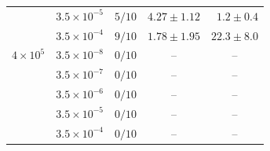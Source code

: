 \begin{table}[htbp]
{\begin{tabular}{llrrr}
 & $3.5 \times 10^{-5}$ & $5/10$ & $4.27 \pm 1.12$ & $1.2 \pm 0.4$ \\
 & $3.5 \times 10^{-4}$ & $9/10$ & $1.78 \pm 1.95$ & $22.3 \pm 8.0$ \\
\midrule
$4 \times 10^{5}$ & $3.5 \times 10^{-8}$ & $0/10$ & \multicolumn{1}{c}{--} & \multicolumn{1}{c}{--} \\
 & $3.5 \times 10^{-7}$ & $0/10$ & \multicolumn{1}{c}{--} & \multicolumn{1}{c}{--} \\
 & $3.5 \times 10^{-6}$ & $0/10$ & \multicolumn{1}{c}{--} & \multicolumn{1}{c}{--} \\
 & $3.5 \times 10^{-5}$ & $0/10$ & \multicolumn{1}{c}{--} & \multicolumn{1}{c}{--} \\
 & $3.5 \times 10^{-4}$ & $0/10$ & \multicolumn{1}{c}{--} & \multicolumn{1}{c}{--} \\
\bottomrule
\end{tabular}
}
\end{table}
